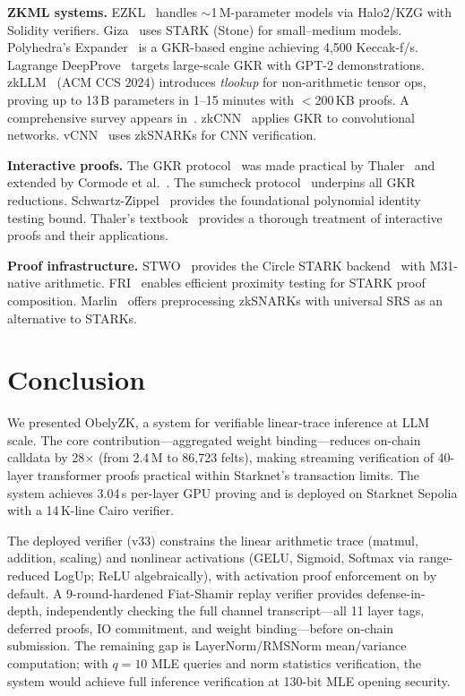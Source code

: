 \documentclass[10pt,twocolumn]{article}
\theoremstyle{definition}
\theoremstyle{remark}
\begin{document}
\textbf{ZKML systems.}
EZKL~\cite{ezkl2024} handles $\sim$1\,M-parameter models via Halo2/KZG
with Solidity verifiers.
Giza~\cite{giza2024} uses STARK (Stone) for small--medium models.
Polyhedra's Expander~\cite{polyhedra2024expander} is a GKR-based engine
achieving 4{,}500 Keccak-f/s.
Lagrange DeepProve~\cite{lagrange2024} targets large-scale GKR with
GPT-2 demonstrations.
zkLLM~\cite{sun2024zkllm} (ACM CCS 2024) introduces \emph{tlookup}
for non-arithmetic tensor ops, proving up to 13\,B parameters in
1--15 minutes with $<$200\,KB proofs.
A comprehensive survey appears in~\cite{xing2025zkml}.
zkCNN~\cite{liu2021zkcnn} applies GKR to convolutional networks.
vCNN~\cite{lee2024vcnn} uses zkSNARKs for CNN verification.

\textbf{Interactive proofs.}
The GKR protocol~\cite{goldwasser2015delegating} was made practical
by Thaler~\cite{thaler2013time} and extended by Cormode et
al.~\cite{cormode2012practical}.
The sumcheck protocol~\cite{lund1992algebraic} underpins all GKR
reductions.
Schwartz-Zippel~\cite{schwartz1980, zippel1979} provides the
foundational polynomial identity testing bound.
Thaler's textbook~\cite{thaler2022proofs} provides a thorough treatment
of interactive proofs and their applications.

\textbf{Proof infrastructure.}
STWO~\cite{starkware2024stwo} provides the Circle STARK
backend~\cite{habock2024circle} with M31-native arithmetic.
FRI~\cite{ben-sasson2018fri} enables efficient proximity testing
for STARK proof composition.
Marlin~\cite{chiesa2020marlin} offers preprocessing zkSNARKs with
universal SRS as an alternative to STARKs.


\section{Conclusion}\label{sec:conclusion}

We presented ObelyZK, a system for verifiable linear-trace inference
at LLM scale.
The core contribution---aggregated weight binding---reduces on-chain
calldata by 28$\times$ (from 2.4\,M to 86{,}723 felts), making
streaming verification of 40-layer transformer proofs practical within
Starknet's transaction limits.
The system achieves 3.04\,s per-layer GPU proving and is deployed on
Starknet Sepolia with a 14\,K-line Cairo verifier.

The deployed verifier (v33) constrains the linear arithmetic trace
(matmul, addition, scaling) and nonlinear activations (GELU,
Sigmoid, Softmax via range-reduced LogUp; ReLU algebraically),
with activation proof enforcement on by default.
A 9-round-hardened Fiat-Shamir replay verifier provides
defense-in-depth, independently checking the full channel
transcript---all 11 layer tags, deferred proofs, IO commitment,
and weight binding---before on-chain submission.
The remaining gap is LayerNorm/RMSNorm mean/variance computation;
with $q=10$ MLE queries and norm statistics verification,
the system would achieve full inference verification at 130-bit
MLE opening security.
\end{document}
